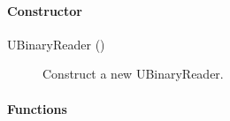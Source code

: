 \paragraph{Constructor}
\label{webots.uobjects.other.ubinaryreader.constructor}%

\noindent
\begin{description}
\item[{UBinaryReader ()}]         Construct a new UBinaryReader.

\end{description}

\paragraph{Functions}
\label{webots.uobjects.other.ubinaryreader.functions}%


